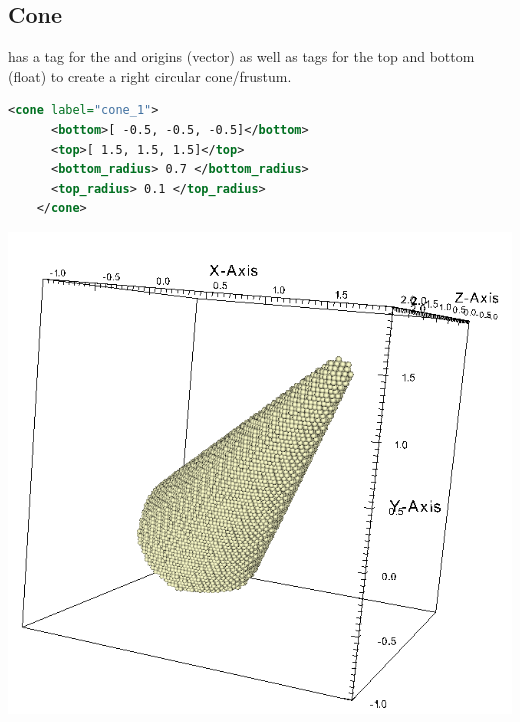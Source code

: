 \subsection{Cone}
\begin{minipage}{0.6\textwidth}
   has a tag for the  and  origins (vector)
  as well as tags for the top and bottom  (float) to create a
  right circular cone/frustum.
  \begin{lstlisting}[language=XML]
    <cone label="cone_1">
      <bottom>[ -0.5, -0.5, -0.5]</bottom>
      <top>[ 1.5, 1.5, 1.5]</top>
      <bottom_radius> 0.7 </bottom_radius>
      <top_radius> 0.1 </top_radius>
    </cone>
  \end{lstlisting}
\end{minipage}
\begin{minipage}{0.4\textwidth}
  \centering
  \includegraphics[width=0.9\columnwidth]{FIGS/geometry/geom_cone.png}
\end{minipage}

